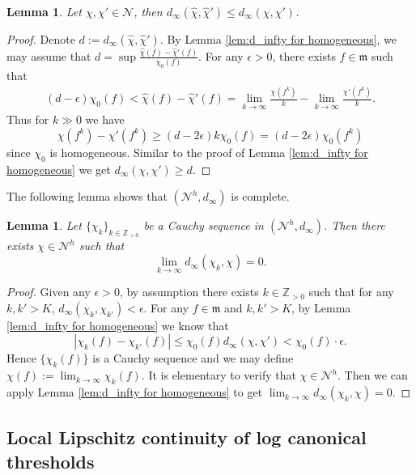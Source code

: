 \documentclass[11pt, leqno]{amsart}%
\theoremstyle{plain}
\newtheorem{lemma}[theorem]{Lemma}
\theoremstyle{definition}
\theoremstyle{remark}
\newcommand{\cN}{\mathcal{N}}
\newcommand{\bZ}{\mathbb{Z}}
\newcommand{\fm}{\mathfrak{m}}
\numberwithin{equation}{section}
\begin{document}
\begin{lemma}\label{lem:d_infty of hom goes down}
    Let $\chi,\chi'\in\cN$, then $d_\infty(\widehat\chi,\widehat{\chi}')\le d_\infty(\chi,\chi')$.
\end{lemma}

\begin{proof}
    Denote $d:=d_\infty(\widehat{\chi},\widehat{\chi}')$. By Lemma \ref{lem:d_infty for homogeneous}, we may assume that $d=\sup\frac{\widehat\chi(f)-\widehat\chi'(f)}{\chi_0(f)}$. For any $\epsilon>0$, there exists $f\in \fm$ such that 
    \begin{align*}
        (d-\epsilon)\chi_0(f)<\widehat\chi(f)-\widehat{\chi}'(f)=\lim_{k\to\infty}\frac{\chi(f^k)}{k}-\lim_{k\to\infty}\frac{\chi'(f^k)}{k}.
    \end{align*}
    Thus for $k\gg 0$ we have 
    \[
        \chi(f^k)-\chi'(f^k)\ge (d-2\epsilon)k\chi_0(f)=(d-2\epsilon)\chi_0(f^k)
    \]
    since $\chi_0$ is homogeneous. Similar to the proof of Lemma \ref{lem:d_infty for homogeneous} we get $d_\infty(\chi,\chi')\ge d$. 
\end{proof}

The following lemma shows that $(\cN^h,d_\infty)$ is complete.

\begin{lemma}\label{lem:d_infty is complete}
    Let $\{\chi_k\}_{k\in\bZ_{> 0}}$ be a Cauchy sequence in $(\cN^h,d_\infty)$. Then there exists $\chi\in\cN^h$ such that 
    \[ 
        \lim_{k\to\infty} d_\infty(\chi_k,\chi)=0.
    \]
\end{lemma}

\begin{proof}
    Given any $\epsilon>0$, by assumption there exists $k\in\bZ_{>0}$ such that for any $k,k'>K$, $d_\infty(\chi_k,\chi_{k'})<\epsilon$. For any $f\in\fm$ and $k,k'>K$, by Lemma \ref{lem:d_infty for homogeneous} we know that 
    \[
        |\chi_k(f)-\chi_{k'}(f)|\le \chi_0(f)d_\infty(\chi,\chi')<\chi_0(f)\cdot\epsilon.
    \]
    Hence $\{\chi_k(f)\}$ is a Cauchy sequence and we may define $\chi(f):=\lim_{k\to\infty}\chi_k(f)$. 
    It is elementary to verify that $\chi\in\cN^h$. Then we can apply Lemma \ref{lem:d_infty for homogeneous} to get $\lim_{k\to\infty} d_\infty(\chi_k,\chi)=0$.
\end{proof}




\subsection{Local Lipschitz continuity of log canonical thresholds}\label{ssec:effective}
\end{document}
